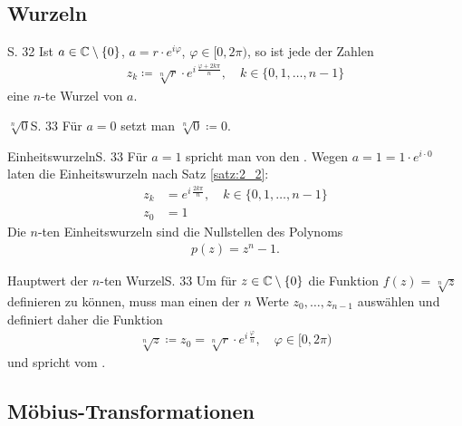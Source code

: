 \subsection{Wurzeln}

\begin{satz}[$n$-te Wurzeln]{S. 32}
  \label{satz:2_2}
  Ist $a \in \mathbb{C}\setminus\{0\}$, $a = r \cdot e^{i\varphi}$, $\varphi \in [0, 2\pi)$, so ist jede der Zahlen
  \begin{align}
    z_k \coloneqq \sqrt[n]{r} \cdot e^{i \, \frac{\varphi + 2k\pi}{n}}, \quad k \in \{ 0, 1, \dots, n-1 \}
  \end{align}
  eine $n$-te Wurzel von $a$.
\end{satz}

\begin{bemerkung}{$\sqrt[n]{0}$}{S. 33}
  Für $a = 0$ setzt man $\sqrt[n]{0} \coloneqq 0$.
\end{bemerkung}

\begin{bemerkung}{Einheitswurzeln}{S. 33}
  Für $a = 1$ spricht man von den . Wegen $a = 1 = 1 \cdot e^{i \cdot 0}$ laten die Einheitswurzeln nach Satz \ref{satz:2_2}:
  \begin{align}
    z_k &= e^{i \, \frac{2k\pi}{n}}, \quad k \in \{ 0, 1, \dots, n-1 \}\\
    z_0 &= 1
  \end{align}
  Die $n$-ten Einheitswurzeln sind die Nullstellen des Polynoms
  \begin{align}
    p(z) = z^n - 1 .
  \end{align}
\end{bemerkung}

\begin{bemerkung}{Hauptwert der $n$-ten Wurzel}{S. 33}
  Um für $z \in \mathbb{C}\setminus\{0\}$ die Funktion $f(z) = \sqrt[n]{z}$ definieren zu können, muss man einen der $n$ Werte $z_0, \dots, z_{n-1}$ auswählen und definiert daher die Funktion
  \begin{align}
    \sqrt[n]{z} \coloneqq z_0 = \sqrt[n]{r} \cdot e^{i \, \frac{\varphi}{n}}, \quad \varphi \in [0, 2\pi)
  \end{align}
  und spricht vom .
\end{bemerkung}



\subsection{Möbius-Transformationen}

